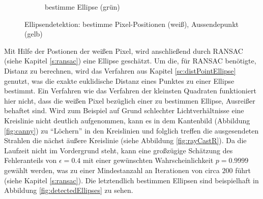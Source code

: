 \begin{figure}[!htb]
\begin{subfigure}{.5\textwidth}
		\caption{bestimme Ellipse (grün)}
		\label{fig:rayCastWE}
	\end{subfigure}
	\caption{Ellipsendetektion: bestimme Pixel-Positionen (weiß), Aussendepunkt (gelb)}
	\label{fig:rayCast}
\end{figure}

Mit Hilfe der Postionen der weißen Pixel, wird anschließend durch RANSAC (siehe Kapitel \ref{s:ransac}) eine Ellipse geschätzt. Um die, für RANSAC benötigte, Distanz zu berechnen, wird das Verfahren aus Kapitel \ref{sc:distPointEllipse} genutzt, was die exakte euklidische Distanz eines Punktes zu einer Ellipse bestimmt. Ein Verfahren wie das Verfahren der kleinsten Quadraten funktioniert hier nicht, dass die weißen Pixel bezüglich einer zu bestimmen Ellipse, Ausreißer behaftet sind. Wird zum Beispiel auf Grund schlechter Lichtverhältnisse eine Kreislinie nicht deutlich aufgenommen, kann es in dem Kantenbild (Abbildung \ref{fig:canny}) zu "`Löchern"' in den Kreislinien und folglich treffen die ausgesendeten Strahlen die nächst äußere Kreislinie (siehe Abbildung \ref{fig:rayCastR}). Da die Laufzeit nicht im Vordergrund steht, kann eine großzügige Schätzung des Fehleranteils von $\epsilon = 0.4$ mit einer gewünschten Wahrscheinlichkeit $p = 0.9999$ gewählt werden, was zu einer Mindestanzahl an Iterationen von circa $200$ führt (siehe Kapitel \ref{s:ransac}). Die letztendlich bestimmen Ellipsen sind beispielhaft in Abbildung \ref{fig:detectedEllipses} zu sehen.  


